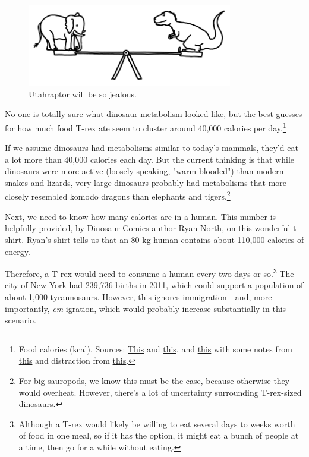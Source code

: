 {\begin{figure}[!htbp]
\centering
\includegraphics[scale=0.5, max width=0.8\textwidth]{imgs/a/78/trex_elephant.png}
\caption{Utahraptor will be so jealous.}
\end{figure}

{No one is totally sure what dinosaur metabolism looked like, but the best guesses for how much food T-rex ate seem to cluster around 40,000 calories per day.{\footnote{Food calories (kcal). Sources: \href{http://www.pnas.org/content/106/29/12184.full}{This} and \href{http://palaeo-electronica.org/1999\_2/gigan/issue2\_99.htm}{this}, and \href{http://www.jstor.org/discover/10.2307/2666002}{this} with some notes from \href{http://www.plosone.org/article/info\%3Adoi\%2F10.1371\%2Fjournal.pone.0026037}{this} and distraction from \href{http://regex.alf.nu/} {this}.} } }

{If we assume dinosaurs had metabolisms similar to today's mammals, they'd eat a lot more than 40,000 calories each day. But the current thinking is that while dinosaurs were more active (loosely speaking, "warm-blooded") than modern snakes and lizards, very large dinosaurs probably had metabolisms that more closely resembled komodo dragons than elephants and tigers.{\footnote{For big sauropods, we know this must be the case, because otherwise they would overheat. However, there's a lot of uncertainty surrounding T-rex-sized dinosaurs.} } }

{Next, we need to know how many calories are in a human. This number is helpfully provided, by Dinosaur Comics author Ryan North, on \href{http://www.topatoco.com/merchant.mvc?Screen=PROD&Store\_Code=TO&Product\_Code=QW-PERSON&Category\_Code=QW}{this wonderful t-shirt}. Ryan's shirt tells us that an 80-kg human contains about 110,000 calories of energy.}

{Therefore, a T-rex would need to consume a human every two days or so.{\footnote{Although a T-rex would likely be willing to eat several days to weeks worth of food in one meal, so if it has the option, it might eat a bunch of people at a time, then go for a while without eating.} } The city of New York had 239,736 births in 2011, which could support a population of about 1,000 tyrannosaurs. However, this ignores immigration—and, more importantly, \emph{em} igration, which would probably increase substantially in this scenario.}

}
